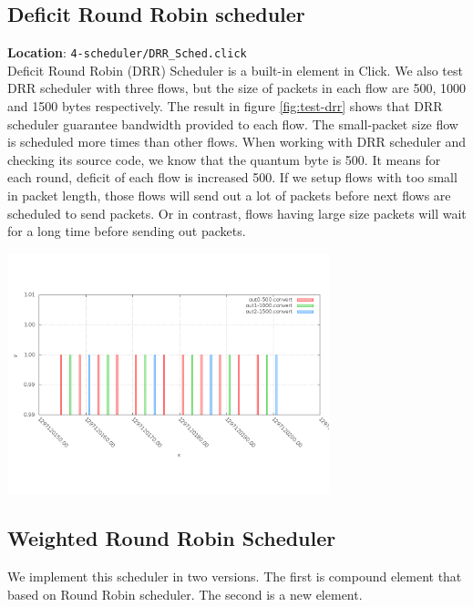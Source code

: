 \documentclass[a4paper]{article}
\begin{document}
  \subsection{Deficit Round Robin scheduler}
  \textbf{Location}: \texttt{4-scheduler/DRR\_Sched.click}\\
  Deficit Round Robin (DRR) Scheduler is a built-in element in Click. We also test DRR scheduler with three flows, but the size of packets in each flow are 500, 1000 and 1500 bytes respectively. The result in figure \ref{fig:test-drr} shows that DRR scheduler guarantee bandwidth provided to each flow. The small-packet size flow is scheduled more times than other flows. When working with DRR scheduler and checking its source code, we know that the quantum byte is 500. It means for each round, deficit of each flow is increased 500. If we setup flows with too small in packet length, those flows will send out a lot of packets before next flows are scheduled to send packets. Or in contrast, flows having large size packets will wait for a long time before sending out packets.
  \begin{center}
	\includegraphics[width=0.70\textwidth]{drr-dense.png}
	\label{fig:test-drr}
  \end{center}
  
  \subsection{Weighted Round Robin Scheduler}
  We implement this scheduler in two versions. The first is compound element that based on Round Robin scheduler. The second is a new element.
\end{document}
